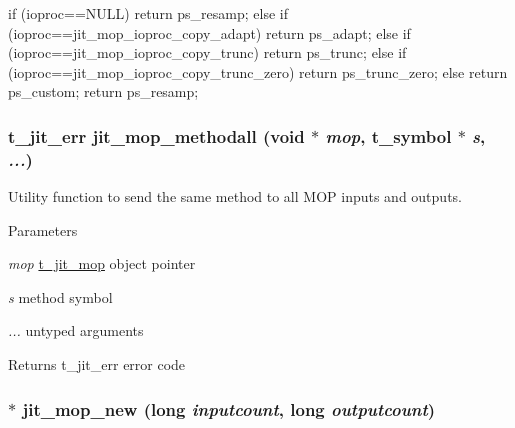 \begin{DoxyCode}
 if (ioproc==NULL) {
 return ps_resamp;
 } else if (ioproc==jit_mop_ioproc_copy_adapt) {
 return ps_adapt;   
 } else if (ioproc==jit_mop_ioproc_copy_trunc) {
 return ps_trunc;   
 } else if (ioproc==jit_mop_ioproc_copy_trunc_zero) {
 return ps_trunc_zero;  
 } else {
 return ps_custom;  
 }
 return ps_resamp;
\end{DoxyCode}
 \hypertarget{group__mopmod_ga9445dd7ead35149f1349d580c3f54d83}{
\subsubsection[{jit\_\-mop\_\-methodall}]{\setlength{\rightskip}{0pt plus 5cm}t\_\-jit\_\-err jit\_\-mop\_\-methodall (void $\ast$ {\em mop}, \/  {\bf t\_\-symbol} $\ast$ {\em s}, \/   {\em ...})}}
\label{group__mopmod_ga9445dd7ead35149f1349d580c3f54d83}


Utility function to send the same method to all MOP inputs and outputs. 
\begin{DoxyParams}{Parameters}
\item[{\em mop}]\hyperlink{structt__jit__mop}{t\_\-jit\_\-mop} object pointer \item[{\em s}]method symbol \item[{\em ...}]untyped arguments\end{DoxyParams}
\begin{DoxyReturn}{Returns}
t\_\-jit\_\-err error code 
\end{DoxyReturn}
\hypertarget{group__mopmod_ga0ae171d2c2adebf3f8ba5183e53cd763}{
\subsubsection[{jit\_\-mop\_\-new}]{ $\ast$ jit\_\-mop\_\-new (long {\em inputcount}, \/  long {\em outputcount})}}
\label{group__mopmod_ga0ae171d2c2adebf3f8ba5183e53cd763}


